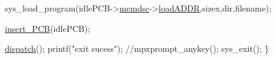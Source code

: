 \begin{DoxyCode}
        sys\_load\_program(idlePCB->\hyperlink{structprocess_a163551ab7b60184b48e5d440fcd5c2b8}{memdsc}->\hyperlink{structmem_a8f5a4db03ee0560e6bd4dd602ad753c0}{loadADDR},sizex,dir,filename);

        \hyperlink{mpx__r2_8c_aa3b334e3a5afd6e590917667ad359a6f}{insert_PCB}(idlePCB);


        \hyperlink{mpx__r3_8c_ad4150c832feb766384417ab7bae70089}{dispatch}();
        printf(\textcolor{stringliteral}{"exit sucess"});
        \textcolor{comment}{//mpxprompt\_anykey();}
        sys\_exit();
\}
\end{DoxyCode}


